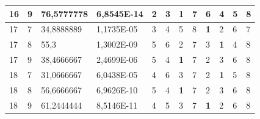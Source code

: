 \documentclass[conference]{IEEEtran}
\begin{document}
\begin{table}[]
\begin{tabular}{|llll|llllllll|}
		\multicolumn{1}{|l|}{16}  & \multicolumn{1}{l|}{9}         & \multicolumn{1}{l|}{76,5777778}    & 6,8545E-14 & \multicolumn{1}{l|}{2}          & \multicolumn{1}{l|}{3}          & \multicolumn{1}{l|}{\textbf{1}} & \multicolumn{1}{l|}{7}   & \multicolumn{1}{l|}{6}          & \multicolumn{1}{l|}{4}          & \multicolumn{1}{l|}{5}   & 8                      \\ \hline
		\multicolumn{1}{|l|}{17}  & \multicolumn{1}{l|}{7}         & \multicolumn{1}{l|}{34,8888889}    & 1,1735E-05 & \multicolumn{1}{l|}{3}          & \multicolumn{1}{l|}{4}          & \multicolumn{1}{l|}{5}          & \multicolumn{1}{l|}{8}   & \multicolumn{1}{l|}{\textbf{1}} & \multicolumn{1}{l|}{2}          & \multicolumn{1}{l|}{6}   & 7                      \\ \hline
		\multicolumn{1}{|l|}{17}  & \multicolumn{1}{l|}{8}         & \multicolumn{1}{l|}{55,3}          & 1,3002E-09 & \multicolumn{1}{l|}{5}          & \multicolumn{1}{l|}{6}          & \multicolumn{1}{l|}{2}          & \multicolumn{1}{l|}{7}   & \multicolumn{1}{l|}{3}          & \multicolumn{1}{l|}{\textbf{1}} & \multicolumn{1}{l|}{4}   & 8                      \\ \hline
		\multicolumn{1}{|l|}{17}  & \multicolumn{1}{l|}{9}         & \multicolumn{1}{l|}{38,4666667}    & 2,4699E-06 & \multicolumn{1}{l|}{5}          & \multicolumn{1}{l|}{4}          & \multicolumn{1}{l|}{\textbf{1}} & \multicolumn{1}{l|}{7}   & \multicolumn{1}{l|}{2}          & \multicolumn{1}{l|}{3}          & \multicolumn{1}{l|}{6}   & 8                      \\ \hline
		\multicolumn{1}{|l|}{18}  & \multicolumn{1}{l|}{7}         & \multicolumn{1}{l|}{31,0666667}    & 6,0438E-05 & \multicolumn{1}{l|}{4}          & \multicolumn{1}{l|}{6}          & \multicolumn{1}{l|}{3}          & \multicolumn{1}{l|}{7}   & \multicolumn{1}{l|}{2}          & \multicolumn{1}{l|}{\textbf{1}} & \multicolumn{1}{l|}{5}   & 8                      \\ \hline
		\multicolumn{1}{|l|}{18}  & \multicolumn{1}{l|}{8}         & \multicolumn{1}{l|}{56,6666667}    & 6,9626E-10 & \multicolumn{1}{l|}{5}          & \multicolumn{1}{l|}{4}          & \multicolumn{1}{l|}{\textbf{1}} & \multicolumn{1}{l|}{7}   & \multicolumn{1}{l|}{2}          & \multicolumn{1}{l|}{3}          & \multicolumn{1}{l|}{6}   & 8                      \\ \hline
		\multicolumn{1}{|l|}{18}  & \multicolumn{1}{l|}{9}         & \multicolumn{1}{l|}{61,2444444}    & 8,5146E-11 & \multicolumn{1}{l|}{4}          & \multicolumn{1}{l|}{5}          & \multicolumn{1}{l|}{3}          & \multicolumn{1}{l|}{7}   & \multicolumn{1}{l|}{\textbf{1}} & \multicolumn{1}{l|}{2}          & \multicolumn{1}{l|}{6}   & 8                      \\ \hline

\end{tabular}
\end{table}
\end{document}
